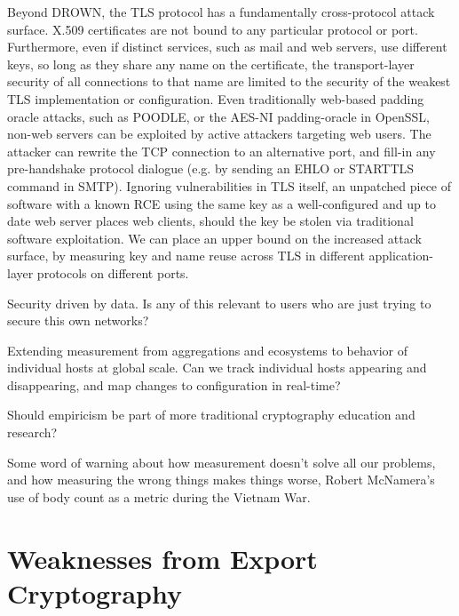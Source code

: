 Beyond DROWN, the TLS protocol has a fundamentally cross-protocol attack
surface. X.509 certificates are not bound to any particular protocol or port.
Furthermore, even if distinct services, such as mail and web servers, use
different keys, so long as they share any name on the certificate, the
transport-layer security of all connections to that name are limited to the
security of the weakest TLS implementation or configuration. Even traditionally
web-based padding oracle attacks, such as POODLE, or the AES-NI padding-oracle
in OpenSSL, non-web servers can be exploited by active attackers targeting web
users. The attacker can rewrite the TCP connection to an alternative port, and
fill-in any pre-handshake protocol dialogue (e.g. by sending an EHLO or
STARTTLS command in SMTP). Ignoring vulnerabilities in TLS itself, an unpatched
piece of software with a known RCE using the same key as a well-configured and
up to date web server places web clients, should the key be stolen via
traditional software exploitation. We can place an upper bound on the increased
attack surface, by measuring key and name reuse across TLS in different
application-layer protocols on different ports.

Security driven by data. Is any of this relevant to users who are just trying
to secure this own networks?

Extending measurement from aggregations and ecosystems to behavior of
individual hosts at global scale. Can we track individual hosts appearing and
disappearing, and map changes to configuration in real-time?

Should empiricism be part of more traditional cryptography education and research?

Some word of warning about how measurement doesn't solve all our problems,
and how measuring the wrong things makes things worse, \eg Robert McNamera's
use of body count as a metric during the Vietnam War.



\section{Weaknesses from Export Cryptography}

